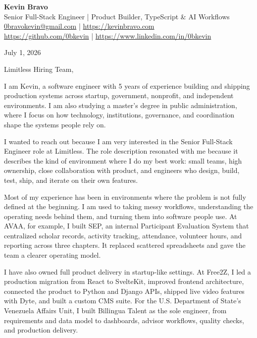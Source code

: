 \documentclass[11pt]{article}
\begin{document}
\raggedright

\begin{center}
    {\LARGE \textbf{Kevin Bravo}}\\
    Senior Full-Stack Engineer | Product Builder, TypeScript \& AI Workflows \\
    \href{mailto:0bravokevin@gmail.com}{0bravokevin@gmail.com} |
    \href{https://kevinbravo.com}{https://kevinbravo.com} \\
    \href{https://github.com/0bkevin}{https://github.com/0bkevin} |
    \href{https://www.linkedin.com/in/0bkevin/}{https://www.linkedin.com/in/0bkevin}
\end{center}

\vspace{0.5em}

July 1, 2026

Limitless Hiring Team,

I am Kevin, a software engineer with 5 years of experience building and shipping production systems across startup, government, nonprofit, and independent environments. I am also studying a master's degree in public administration, where I focus on how technology, institutions, governance, and coordination shape the systems people rely on.

I wanted to reach out because I am very interested in the Senior Full-Stack Engineer role at Limitless. The role description resonated with me because it describes the kind of environment where I do my best work: small teams, high ownership, close collaboration with product, and engineers who design, build, test, ship, and iterate on their own features.

Most of my experience has been in environments where the problem is not fully defined at the beginning. I am used to taking messy workflows, understanding the operating needs behind them, and turning them into software people use. At AVAA, for example, I built SEP, an internal Participant Evaluation System that centralized scholar records, activity tracking, attendance, volunteer hours, and reporting across three chapters. It replaced scattered spreadsheets and gave the team a clearer operating model.

I have also owned full product delivery in startup-like settings. At Free2Z, I led a production migration from React to SvelteKit, improved frontend architecture, connected the product to Python and Django APIs, shipped live video features with Dyte, and built a custom CMS suite. For the U.S. Department of State's Venezuela Affairs Unit, I built Billingua Talent as the sole engineer, from requirements and data model to dashboards, advisor workflows, quality checks, and production delivery.
\end{document}
